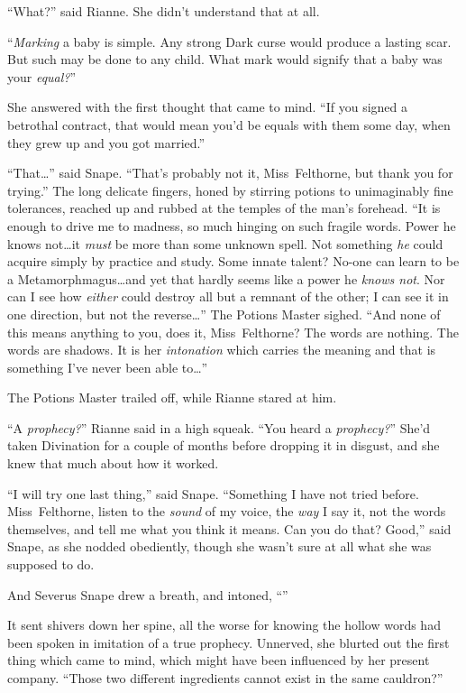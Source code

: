 “What?” said Rianne. She didn’t understand that at all.

“\emph{Marking} a baby is simple. Any strong Dark curse would produce a lasting scar. But such may be done to any child. What mark would signify that a baby was your \emph{equal?}”

She answered with the first thought that came to mind. “If you signed a betrothal contract, that would mean you’d be equals with them some day, when they grew up and you got married.”

“That…” said Snape. “That’s probably not it, Miss~Felthorne, but thank you for trying.” The long delicate fingers, honed by stirring potions to unimaginably fine tolerances, reached up and rubbed at the temples of the man’s forehead. “It is enough to drive me to madness, so much hinging on such fragile words. Power he knows not…it \emph{must} be more than some unknown spell. Not something \emph{he} could acquire simply by practice and study. Some innate talent? No-one can learn to be a Metamorphmagus…and yet that hardly seems like a power he \emph{knows not}. Nor can I see how \emph{either} could destroy all but a remnant of the other; I can see it in one direction, but not the reverse…” The Potions Master sighed. “And none of this means anything to you, does it, Miss~Felthorne? The words are nothing. The words are shadows. It is her \emph{intonation} which carries the meaning and that is something I’ve never been able to…”

The Potions Master trailed off, while Rianne stared at him.

“A \emph{prophecy?}” Rianne said in a high squeak. “You heard a \emph{prophecy?}” She’d taken Divination for a couple of months before dropping it in disgust, and she knew that much about how it worked.

“I will try one last thing,” said Snape. “Something I have not tried before. Miss~Felthorne, listen to the \emph{sound} of my voice, the \emph{way} I say it, not the words themselves, and tell me what you think it means. Can you do that? Good,” said Snape, as she nodded obediently, though she wasn’t sure at all what she was supposed to do.

And Severus Snape drew a breath, and intoned, “”

It sent shivers down her spine, all the worse for knowing the hollow words had been spoken in imitation of a true prophecy. Unnerved, she blurted out the first thing which came to mind, which might have been influenced by her present company. “Those two different ingredients cannot exist in the same cauldron?”


